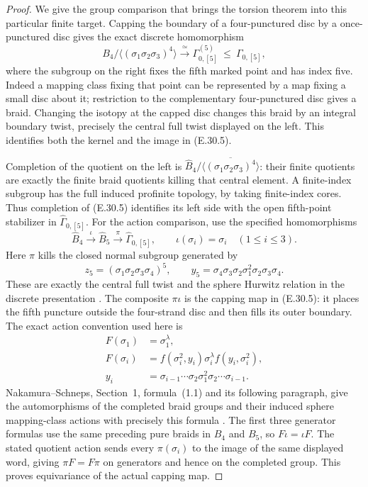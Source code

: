 \begin{proof}
We give the group comparison that brings the torsion theorem
into this particular finite target.  Capping the boundary of
a four-punctured disc by a once-punctured disc gives the exact
discrete homomorphism
\[
 B_4/\langle(\sigma_1\sigma_2\sigma_3)^4\rangle
       \xrightarrow{\ \simeq\ }
 \Gamma_{0,[5]}^{(5)}\ \leq\ \Gamma_{0,[5]},
 \tag{E.30.5}
\]
where the subgroup on the right fixes the fifth marked point
and has index five.  Indeed a mapping class fixing that point
can be represented by a map fixing a small disc about it;
restriction to the complementary four-punctured disc gives a
braid.  Changing the isotopy at the capped disc changes this
braid by an integral boundary twist, precisely the central
full twist displayed on the left.  This identifies both the
kernel and the image in \textup{(E.30.5)}.

Completion of the quotient on the left is
$\widehat B_4/\overline{\langle(\sigma_1\sigma_2\sigma_3)^4\rangle}$:
their finite quotients are exactly the finite braid quotients
killing that central element.  A finite-index subgroup has
the full induced profinite topology, by taking finite-index
cores.  Thus completion of \textup{(E.30.5)} identifies its
left side with the open fifth-point stabilizer in
$\widehat\Gamma_{0,[5]}$.
For the action comparison, use the specified homomorphisms
\[
 \widehat B_4\xrightarrow{\ \iota\ }\widehat B_5
       \xrightarrow{\ \pi\ }\widehat\Gamma_{0,[5]},
 \qquad \iota(\sigma_i)=\sigma_i\quad(1\leq i\leq3).
 \tag{E.30.5a}
\]
Here $\pi$ kills the closed normal subgroup generated by
\[
 z_5=(\sigma_1\sigma_2\sigma_3\sigma_4)^5,
 \qquad y_5=\sigma_4\sigma_3\sigma_2\sigma_1^2
                         \sigma_2\sigma_3\sigma_4.
 \tag{E.30.5b}
\]
These are exactly the central full twist and the sphere
Hurwitz relation in the discrete presentation
\cite[Section 3.1]{ERootCollas2012}.
The composite $\pi\iota$ is the capping map in
\textup{(E.30.5)}: it places the fifth puncture outside the
four-strand disc and then fills its outer boundary.
The exact action convention used here is
\[
 \begin{aligned}
 F(\sigma_1)&=\sigma_1^\lambda,\\
 F(\sigma_i)&=f(\sigma_i^2,y_i)\sigma_i^\lambda
                              f(y_i,\sigma_i^2),\\
 y_i&=\sigma_{i-1}\cdots\sigma_2\sigma_1^2
                              \sigma_2\cdots\sigma_{i-1}.
 \end{aligned}
 \tag{E.30.5c}
\]
Nakamura--Schneps, Section~1, formula~(1.1) and its
following paragraph, give the automorphisms of the completed
braid groups and their induced sphere mapping-class actions
with precisely this formula \cite{BCNakamuraSchneps2000}.
The first three generator formulas use the same preceding
pure braids in $B_4$ and $B_5$, so $F\iota=\iota F$.
The stated quotient action sends every $\pi(\sigma_i)$ to
the image of the same displayed word, giving $\pi F=F\pi$
on generators and hence on the completed group.
This proves equivariance of the actual capping map.


\end{proof}
